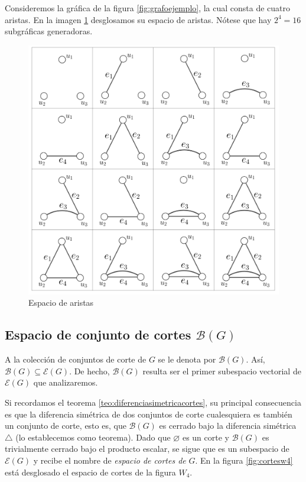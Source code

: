  Consideremos la gráfica de la figura \ref{fig:grafoejemplo}, la cual consta de cuatro aristas. En la imagen \ref{fig:edgespace} desglosamos su espacio de aristas. Nótese que hay $2^{4} = 16$ subgráficas generadoras. 


\begin{figure}[h]
    \centering
    \includegraphics[scale=0.7]{img/imgchapter3/espacioaristas.jpg}
    \caption{Espacio de aristas}
    \label{fig:edgespace}
\end{figure}

\subsection{Espacio de conjunto de cortes $\mathcal{B}(G)$}
A la colección de conjuntos de corte de $G$ se  le denota por $\mathcal{B}(G)$. Así, $\mathcal{B}(G) \subseteq \mathcal{E}(G)$. De hecho, $\mathcal{B}(G)$ resulta ser el primer subespacio vectorial de $\mathcal{E}(G)$ que analizaremos. 

 Si recordamos el teorema \ref{teo:diferenciasimetricacortes}, su principal consecuencia es que la diferencia simétrica de dos conjuntos de corte cualesquiera es también un conjunto de corte, esto es, que $\mathcal{B}(G)$ es cerrado bajo la diferencia simétrica $\triangle$ (lo establecemos como teorema). Dado que $\varnothing$ es un corte y $\mathcal{B}(G)$ es trivialmente cerrado bajo el producto escalar, se sigue que \bond es un subespacio de $\mathcal{E}(G)$ y recibe el nombre de \textit{espacio de cortes de} $G$. En la figura \ref{fig:cortesw4} está desglosado el espacio de cortes de la figura $W_{4}$.

